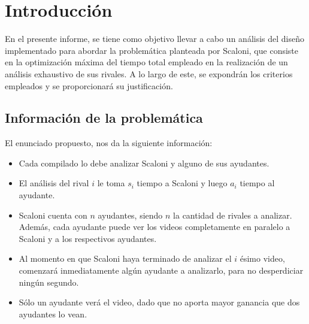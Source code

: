 \section{Introducción}

En el presente informe, se tiene como objetivo llevar a cabo un análisis del diseño 
implementado para abordar la problemática planteada por Scaloni, que consiste en la 
optimización máxima del tiempo total empleado en la realización de un análisis exhaustivo 
de sus rivales. A lo largo de este, se expondrán los criterios empleados y se proporcionará 
su justificación.


\subsection{Información de la problemática}

El enunciado propuesto, nos da la siguiente información:

\begin{itemize}

    \item Cada compilado lo debe analizar Scaloni y alguno de sus ayudantes.

    \item El análisis del rival $i$ le toma $s_i$ tiempo a Scaloni y luego $a_i$ tiempo al ayudante.

    \item Scaloni cuenta con $n$ ayudantes, siendo $n$ la cantidad de rivales a analizar. Además, cada
        ayudante puede ver los videos completamente en paralelo a Scaloni y a los respectivos ayudantes.

    \item Al momento en que Scaloni haya terminado de analizar el $i$ ésimo video, comenzará
        inmediatamente algún ayudante a analizarlo, para no desperdiciar ningún segundo.

    \item Sólo un ayudante verá el video, dado que no aporta mayor ganancia que dos ayudantes lo vean.

\end{itemize}
